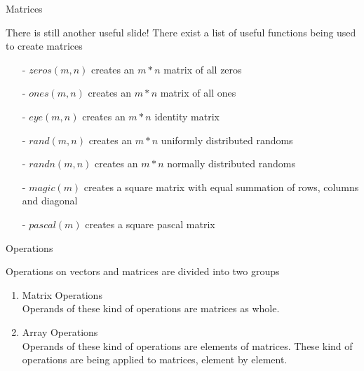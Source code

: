 \documentclass{beamer}
\begin{document}
\begin{frame}{Matrices}
	\begin{block}{There is still another useful slide!}
		There exist a list of useful functions being used to create matrices
		\begin{itemize}
			\item[-]$zeros(m,n)$ creates an $m * n$ matrix of all zeros
			\item[-]$ones(m,n)$ creates an $m * n$ matrix of all ones
			\item[-]$eye(m,n)$ creates an $m * n$ identity matrix
			\item[-]$rand(m,n)$ creates an $m * n$ uniformly distributed randoms
			\item[-]$randn(m,n)$ creates an $m * n$ normally distributed randoms
			\item[-]$magic(m)$ creates a square matrix with equal summation of rows, columns and diagonal
			\item[-]$pascal(m)$ creates a square pascal matrix
		\end{itemize}
	\end{block}

\end{frame}

\begin{frame}{Operations}
	\begin{block}{}
		Operations on vectors and matrices are divided into two groups
		\begin{enumerate}
			\item Matrix Operations \\
			Operands of these kind of operations are matrices as whole. 
			\item Array Operations \\
			Operands of these kind of operations are elements of matrices. These kind of operations are being applied to matrices, element by element. 
		\end{enumerate}
	\end{block}
\end{frame}
\end{document}
